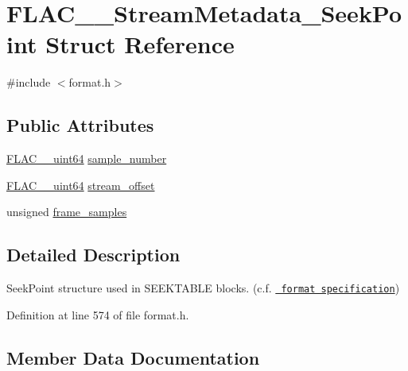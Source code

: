 \hypertarget{struct_f_l_a_c_____stream_metadata___seek_point}{}\section{F\+L\+A\+C\+\_\+\+\_\+\+Stream\+Metadata\+\_\+\+Seek\+Point Struct Reference}
\label{struct_f_l_a_c_____stream_metadata___seek_point}


{\ttfamily \#include $<$format.\+h$>$}

\subsection*{Public Attributes}
\begin{DoxyCompactItemize}
\item 
\mbox{\hyperlink{ordinals_8h_aa78c8c70a3eb8a58af7436f278acde8e}{F\+L\+A\+C\+\_\+\+\_\+uint64}} \mbox{\hyperlink{struct_f_l_a_c_____stream_metadata___seek_point_a96a62923f1443fd3a5a3498e701e6ecf}{sample\+\_\+number}}
\item 
\mbox{\hyperlink{ordinals_8h_aa78c8c70a3eb8a58af7436f278acde8e}{F\+L\+A\+C\+\_\+\+\_\+uint64}} \mbox{\hyperlink{struct_f_l_a_c_____stream_metadata___seek_point_a6028398e99f937b002618af677d32c9f}{stream\+\_\+offset}}
\item 
unsigned \mbox{\hyperlink{struct_f_l_a_c_____stream_metadata___seek_point_a247ce3f0d45a56c202e623742309fe61}{frame\+\_\+samples}}
\end{DoxyCompactItemize}


\subsection{Detailed Description}
Seek\+Point structure used in S\+E\+E\+K\+T\+A\+B\+LE blocks. (c.\+f. \href{../format.html\#seekpoint}{\texttt{ format specification}}) 

Definition at line 574 of file format.\+h.



\subsection{Member Data Documentation}
\mbox{\label{struct_f_l_a_c_____stream_metadata___seek_point_a247ce3f0d45a56c202e623742309fe61}} 
